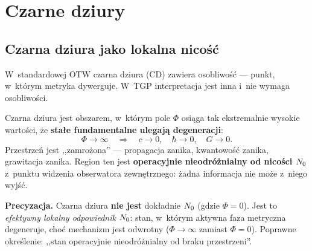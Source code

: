 \section{Czarne dziury}\label{sec:czarne}

\subsection{Czarna dziura jako lokalna nico\'s\'c}\label{ssec:cd-N0}

W~standardowej OTW czarna dziura (CD) zawiera osobliwo\'s\'c ---
punkt, w~kt\'orym metryka dywerguje. W~TGP interpretacja jest
inna i~nie wymaga osobliwo\'sci.

\begin{proposition}\label{prop:cd}
Czarna dziura jest obszarem, w~kt\'orym pole $\Phi$ osi\k{a}ga
tak ekstremalnie wysokie warto\'sci, \.ze \textbf{sta\l{}e
fundamentalne ulegaj\k{a} degeneracji}:
\begin{equation}
    \Phi \to \infty
    \quad\Longrightarrow\quad
    c \to 0,\quad \hbar \to 0,\quad G \to 0.
\end{equation}
Przestrze\'n jest ,,zamro\.zona'' --- propagacja zanika,
kwantowo\'s\'c zanika, grawitacja zanika. Region ten jest
\textbf{operacyjnie nieodr\'o\.znialny od nico\'sci $N_0$}
z~punktu widzenia obserwatora zewn\k{e}trznego: \.zadna
informacja nie mo\.ze z~niego wyj\'s\'c.

\medskip\noindent\textbf{Precyzacja.}
Czarna dziura \textbf{nie jest} dok\l{}adnie $N_0$
(gdzie $\Phi = 0$). Jest to \emph{efektywny lokalny
odpowiednik} $N_0$: stan, w~kt\'orym aktywna faza
metryczna degeneruje, cho\'c mechanizm jest odwrotny
($\Phi \to \infty$ zamiast $\Phi = 0$).
Poprawne okre\'slenie: ,,stan operacyjnie nieodr\'o\.znialny
od braku przestrzeni''.
\end{proposition}

